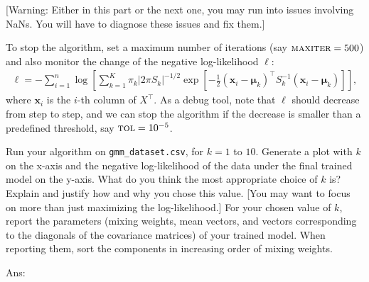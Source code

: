 \documentclass[10pt,letter,notitlepage]{article}
\newcommand{\xv}{\mathbf{x}}
\newcommand{\ans}[1]{{\color{orange}\textsf{Ans}: #1}}
\newcounter{exercise}
\begin{document}
\begin{exercise}
\begin{enumerate}[label=\alph*)]
		[You might want to review the steps we took in class for a simpler case, and ensure you can derive the updates in . Then adapt the steps to the simpler diagonal case. The solution should look like $s_j = \frac{\sum_{i=1}^n r_{ik} (x_{ij} - \mu_j)^2}{\sum_{i=1}^n r_{ik} } = \frac{\sum_{i=1}^n r_{ik} x_{ij} ^2}{\sum_{i=1}^n r_{ik} } - \mu_j^2$ for the $j$-th diagonal. Multiplying an $n\times p$ matrix with a $p\times m$ matrix costs $O(mnp)$. Do not maintain a diagonal matrix explicitly; using a vector for its diagonal suffices. ]

      [Warning: Either in this part or the next one, you may run into issues involving NaNs. You will have to diagnose these issues and fix them.]

		To stop the algorithm, set a maximum number of iterations (say $\textsc{maxiter} = 500$) and also monitor the change of the negative log-likelihood $\ell$:
		\begin{align}
		\ell = -\sum_{i=1}^n \log\left[\sum_{k=1}^K \pi_k |2\pi S_k|^{-1/2} \exp[ -\tfrac{1}{2}(\xv_i -\boldsymbol{\mu}_k)^\top S_k^{-1} (\xv_i - \boldsymbol{\mu}_k ) ]\right],
		\end{align}
		where $\xv_i$ is the $i$-th column of $X^\top$.
		As a debug tool, note that $\ell$ should decrease from step to step, and we can stop the algorithm if the decrease is smaller than a predefined threshold, say $\textsc{tol} = 10^{-5}$.
      \label{ex:gmm}


    Run your algorithm on \texttt{gmm\_dataset.csv}, for $k = 1$ to $10$.
    Generate a plot with $k$ on the x-axis and the negative log-likelihood of the data under the final trained model on the y-axis.
    What do you think the most appropriate choice of $k$ is?
    Explain and justify how and why you chose this value.
    [You may want to focus on more than just maximizing the log-likelihood.]
    For your chosen value of $k$, report the parameters (mixing weights, mean vectors, and vectors corresponding to the diagonals of the covariance matrices) of your trained model.
    When reporting them, sort the components in increasing order of mixing weights.


		\ans{}



\end{enumerate}
\end{exercise}
\end{document}
